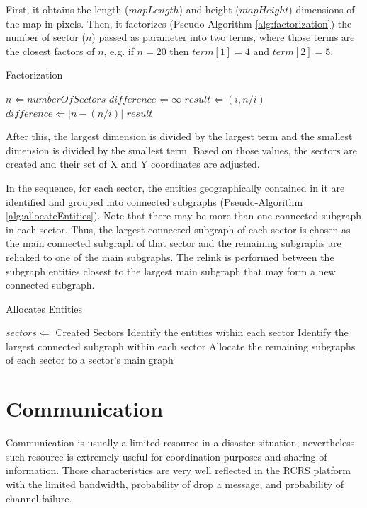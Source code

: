 \documentclass{llncs}
\begin{document}
First, it obtains the length ($mapLength$) and height ($mapHeight$) dimensions of the map in pixels. Then, it factorizes (Pseudo-Algorithm \ref{alg:factorization}) the number of sector ($n$) passed as parameter into two terms, where those terms are the closest factors of $n$, e.g. if $n = 20$ then $term[1] = 4$ and $term[2] = 5$.
\begin{algorithm}
  \caption{Factorization}
  \label{alg:factorization}
  \begin{algorithmic}
    \REQUIRE $n \Leftarrow numberOfSectors$
    \STATE
    \STATE $difference \Leftarrow \infty$
          \STATE $result \Leftarrow (i, n / i)$
          \STATE $difference \Leftarrow \left|n - (n / i)\right|$ 
        \ENDIF
      \ENDIF
    \ENDFOR
    \RETURN $result$
  \end{algorithmic}
\end{algorithm}

After this, the largest dimension is divided by the largest term and the smallest dimension is divided by the smallest term. Based on those values, the sectors are created and their set of X and Y coordinates are adjusted.

In the sequence, for each sector, the entities geographically contained in it are identified and grouped into connected subgraphs (Pseudo-Algorithm \ref{alg:allocateEntities}). Note that there may be more than one connected subgraph in each sector. Thus, the largest connected subgraph of each sector is chosen as the main connected subgraph of that sector and the remaining subgraphs are relinked to one of the main subgraphs. The relink is performed between the subgraph entities closest to the largest main subgraph that may form a new connected subgraph.
\begin{algorithm}
  \caption{Allocates Entities}
  \label{alg:allocateEntities}
  \begin{algorithmic}
    \REQUIRE $sectors \Leftarrow$ Created Sectors
    \STATE
    \STATE Identify the entities within each sector
    \STATE Identify the largest connected subgraph within each sector
    \STATE Allocate the remaining subgraphs of each sector to a sector's main graph
  \end{algorithmic}
\end{algorithm}
\section{Communication}
\label{sec:communication}
Communication is usually a limited resource in a disaster situation, nevertheless such resource is extremely useful for coordination purposes and sharing of information. Those characteristics are very well reflected in the RCRS platform with the limited bandwidth, probability of drop a message, and probability of channel failure.
\end{document}
